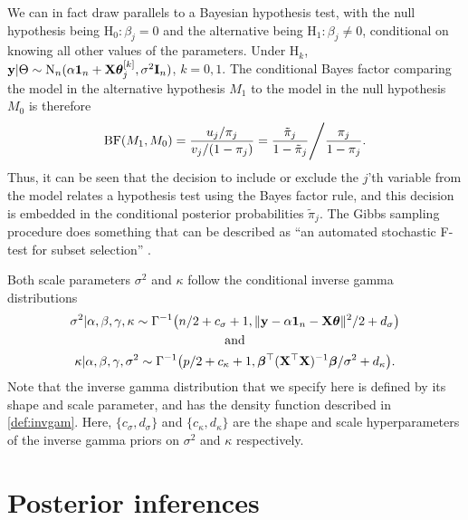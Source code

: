 \documentclass[11pt,twoside,openright]{report}
\begin{document}
We can in fact draw parallels to a Bayesian hypothesis test, with the null hypothesis being $\text{H}_0: \beta_j = 0$ and the alternative being $\text{H}_1: \beta_j \neq 0$, conditional on knowing all other values of the parameters.
Under $\text{H}_k$, ${\mathbf y}|\Theta \sim\operatorname{N}_n(\alpha {\mathbf 1}_n + {\mathbf X}{\bm\theta}_j^{[k]}, \sigma^2{\mathbf I}_n )$, $k=0,1$. 
The conditional Bayes factor comparing the model in the alternative hypothesis $M_1$ to the model in the null hypothesis $M_0$ is therefore
\begin{align*}
  \operatorname{BF}(M_1,M_0) 
  = \frac{u_j/\pi_j}{v_j/(1-\pi_j)} 
  = \frac{\tilde \pi_j  }{1-\tilde \pi_j} \Bigg/ \frac{\pi_j}{ 1-\pi_j }.
\end{align*}
Thus, it can be seen that the decision to include or exclude the $j$'th variable from the model relates a hypothesis test using the Bayes factor rule, and this decision is embedded in the conditional posterior probabilities $\tilde \pi_j$.
The Gibbs sampling procedure does something that can be described as ``an automated stochastic F-test for subset selection'' \citep{Kuo1998}.

Both scale parameters $\sigma^2$ and $\kappa$ follow the conditional inverse gamma distributions
\begin{align*}
  \begin{gathered}
    \sigma^2|\alpha,\beta,\gamma,\kappa \sim \Gamma^{-1}\big(n/2+c_\sigma+1, \Vert {\mathbf y}-\alpha{\mathbf 1}_n-{\mathbf X}{\bm\theta} \Vert^2/2 + d_\sigma \big) \\
    \text{and} \\
    \kappa|\alpha,\beta,\gamma,\sigma^2 \sim \Gamma^{-1}\big(p/2+c_\kappa+1, {\bm\beta}^\top(\mathbf X^\top \mathbf X)^{-1}{\bm\beta}/\sigma^2 + d_\kappa \big). \\
  \end{gathered}
\end{align*}
Note that the inverse gamma distribution that we specify here is defined by its shape and scale parameter, and has the density function described in \cref{def:invgam}.
Here, $\{c_\sigma, d_\sigma\}$ and $\{c_\kappa, d_\kappa\}$ are the shape and scale hyperparameters of the inverse gamma priors on $\sigma^2$ and $\kappa$ respectively.


\section{Posterior inferences}
\end{document}
